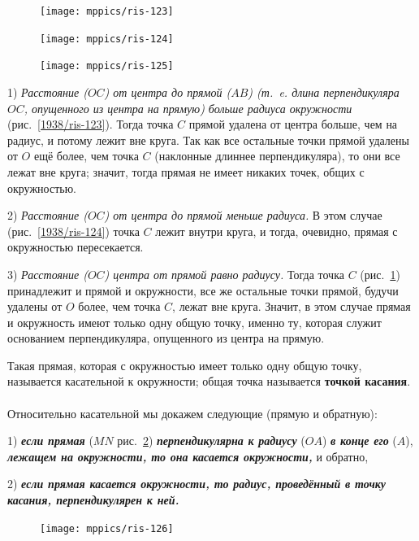 \documentclass[oneside]{book}
\begin{document}
\begin{figure}
\centering
\texttt{[image: mppics/ris-123]}
\caption{}\label{1938/ris-123}
\bigskip
\texttt{[image: mppics/ris-124]}
\caption{}\label{1938/ris-124}
\bigskip
\texttt{[image: mppics/ris-125]}
\caption{}\label{1938/ris-125}
\end{figure}

1) \emph{Расстояние \emph{($OC$)} от центра до прямой \emph{($AB$) (т.~e.
длина перпендикуляра $OC$, опущенного из центра на прямую)} больше радиуса окружности} (рис.~\ref{1938/ris-123}).
Тогда точка $C$ прямой удалена от центра больше, чем на радиус, и потому лежит вне круга.
Так как все остальные точки прямой удалены от $O$ ещё более, чем точка $C$ (наклонные длиннее перпендикуляра), то они все лежат вне круга;
значит, тогда прямая не имеет никаких точек, общих с окружностью.

2) \emph{Расстояние \emph{($OC$)} от центра до прямой меньше радиуса.}
В этом случае (рис.~\ref{1938/ris-124}) точка $C$ лежит внутри круга, и тогда, очевидно, прямая с окружностью пересекается.

3) \emph{Расстояние \emph{($OC$)} центра от прямой равно радиусу.}
Тогда точка $C$ (рис.~\ref{1938/ris-125}) принадлежит и прямой и окружности, все же остальные точки прямой, будучи удалены от $O$ более, чем точка $C$, лежат вне круга.
Значит, в этом случае прямая и окружность имеют только одну общую точку, именно ту, которая служит основанием перпендикуляра, опущенного из центра на прямую.

Такая прямая, которая с окружностью имеет только одну общую точку, называется касательной к окружности;
общая точка называется \textbf{точкой касания}.

\paragraph{}\label{1938/113}
Относительно касательной мы докажем следующие  (прямую и обратную):

1) \textbf{\emph{если прямая}} ($MN$ рис.~\ref{1938/ris-126}) \textbf{\emph{перпендикулярна к радиусу}} ($OA$) \textbf{\emph{в конце его}} ($A$), \textbf{\emph{лежащем на окружности, то она касается окружности,}} и обратно,

2) \textbf{\emph{если прямая касается окружности, то радиус, проведённый в точку касания, перпендикулярен к ней.}}

\begin{figure}
\centering
\texttt{[image: mppics/ris-126]}
\caption{}\label{1938/ris-126}
\end{figure}
\end{document}
